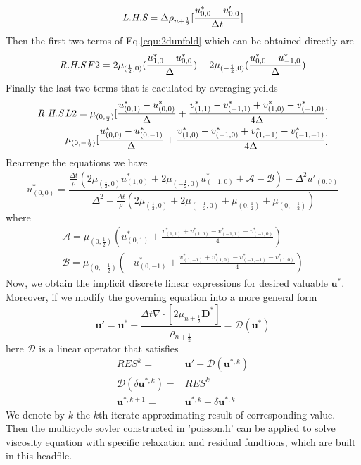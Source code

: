 \documentclass[a4paper]{article}
\begin{document}
\begin{equation}
  \emph{L.H.S}=\Delta\rho_{n+ \frac{1}{2}}[ \frac{u^*_{0,0}-u'_{0,0}}{\Delta t}]
\end{equation}
Then the first two terms of Eq.\ref{equ:2dunfold} which can be obtained directly are
\begin{equation}
  \emph{R.H.S}\,F2 =  2\mu_{(\frac{1}{2},0)}(\frac{u^*_{1,0}-u^*_{0,0}}{\Delta})-2\mu_{(-\frac{1}{2},0)}(\frac{u^*_{0,0}-u^*_{-1,0}}{\Delta})
\end{equation}
Finally the last two terms that is caculated by averaging yeilds
\begin{equation}
\begin{aligned}
  \emph{R.H.S}\,L2 = 
    \mu_{(0,\frac{1}{2})}[\frac{u^*_{(0,1)}-u^*_{(0,0)}}{\Delta}
    +\frac{v^*_{(1,1)}-v^*_{(-1,1)}+v^*_{(1,0)}-v^*_{(-1,0)}}{4\Delta}]\\-\mu_{(0,-\frac{1}{2})}[\frac{u^*_{(0,0)}-u^*_{(0,-1)}}{\Delta}+\frac{v^*_{(1,0)}-v^*_{(-1,0)}+v^*_{(1,-1)}-v^*_{(-1,-1)}}{4\Delta}]
\end{aligned}
\end{equation}
Rearrenge the equations we have
\begin{equation}\label{equ:aim}
    u^*_{(0,0)} = \frac{\frac{\Delta t}{\rho}(2\mu_{(\frac{1}{2},0)}u^*_{(1,0)}+2\mu_{(-\frac{1}{2},0)}u^*_{(-1,0)}+\mathscr{A}-\mathscr{B})+\Delta^2 u'_{(0,0)}}{\Delta^2+\frac{\Delta t}{\rho}(2\mu_{(\frac{1}{2},0)}+2\mu_{(-\frac{1}{2},0)}+\mu_{(0,\frac{1}{2})}+\mu_{(0,-\frac{1}{2})})}
\end{equation}
where
\begin{gather}
    \mathscr{A} = \mu_{(0,\frac{1}{2})}(u^*_{(0,1)}+\frac{v^*_{(1,1)}+v^*_{(1,0)}-v^*_{(-1,1)}-v^*_{(-1,0)}}{4})\\
    \mathscr{B} = \mu_{(0,-\frac{1}{2})}(-u^*_{(0,-1)}+\frac{v^*_{(1,-1)}+v^*_{(1,0)}-v^*_{(-1,-1)}-v^*_{(1,0)}}{4})
\end{gather}
Now, we obtain the implicit discrete linear expressions for desired valuable $ \mathbf{u}^*$. Moreover, if we modify the governing equation into a more general form
\begin{equation}\label{equ:resi}
  \mathbf{u}' = \mathbf{u}^* - \frac{\Delta t\nabla\cdot[2 \mu_{n+ \frac{1}{2}} \mathbf{D}^*]}{\rho_{n + \frac{1}{2}}} = \mathscr{D}( \mathbf{u}^*)
\end{equation}
here $\mathscr{D}$ is a linear operator that satisfies
\begin{align}
  RES^k =& \mathbf{u}'- \mathscr{D}( \mathbf{u}^{*,k}) \\
  \mathscr{D}(\delta \mathbf{u}^{*,k}) =& RES^k \label{equ:delta}\\
  \mathbf{u}^{*,k+1} =& \mathbf{u}^{*,k}+ \delta\mathbf{u}^{*,k}
\end{align}
We denote by $k$ the $k$th iterate approximating result of corresponding value. Then the multicycle sovler constructed in 'poisson.h' can be applied to solve viscosity equation with specific relaxation and residual fundtions, which are built in this headfile. 
\end{document}
